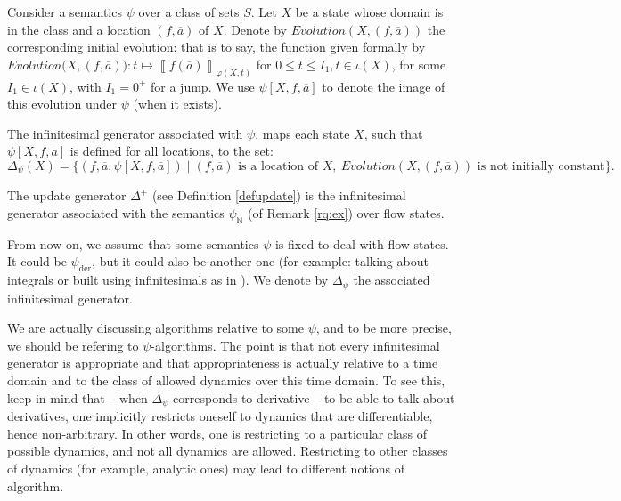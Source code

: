 \documentclass[envcountsame]{llncs}
\newcommand{\N}{\ensuremath{\mathbb{N}}}
\newcommand{\evaluation}[2][]{\ensuremath{\left\llbracket #2\right\rrbracket_{#1}}}
\newcommand{\val}[2]{\evaluation[#2]{#1}}
\newcommand{\update}[3]{(#1,#2,#3)}\spnewtheorem{postulate}{Postulate}{\bfseries}{\itshape}
\newcommand\LOCATION[2]{(#1,#2)}
\newcommand\Deltapsi{\Delta_\psi}
\newcommand{\nd}[1]{#1}\let\ep\endproof
\renewcommand{\endproof}{\qed\ep}
\begin{document}
Consider a semantics $\psi$ over a class of sets $S$.
Let $X$ be a state whose domain is in the class and a location $\LOCATION{f}{\overline{a}}$
of $X$.  Denote by $Evolution({X,\LOCATION{f}{\overline{a}}})$ the corresponding initial
evolution: that is to say, the
function given formally by $Evolution({X,\LOCATION{f}{\overline{a}})}: t \mapsto
\val{f(\overline{a})}{\varphi(X,t)}$ for $0 \le t \le I_1, t \in
\iota(X)$, for some $I_1 \in  \iota(X)$, with $I_1=0^+$ for a jump.
We use $\psi[X,f,\overline{a}]$ to denote the image of this evolution under $\psi$ (when it exists).

\begin{definition} The infinitesimal generator associated with $\psi$,
 maps each state $X$, such that $\psi[X,f,\overline{a}]$ is defined for all locations, to
the set: $\Deltapsi(X) =\{ \update{f}{\overline{a}}{\psi[X,f,\overline{a}]} \mid  \LOCATION{f}{\overline{a}} \mbox{ is a location of
  $X$} ,~
Evolution({X,\LOCATION{f}{\overline{a}}}) \text{ is not initially constant} \}.$
\end{definition}

The update generator $\Delta^+$ (see Definition
\ref{defupdate}) is the infinitesimal generator associated with the
semantics $\psi_\N$ (of Remark \ref{rq:ex}) over flow states. 

From now on, we assume that some semantics $\psi$ is fixed to deal
with flow states. It could be
$\psi_{\textrm{der}}$, but it could also be another one (for example:
talking about integrals or built using infinitesimals as in \cite{rust2000hybrid}).  We denote by
$\Deltapsi$ the associated infinitesimal generator.


We are actually discussing algorithms relative to some
    $\psi$, and to be more precise, we should be refering to $\psi$-algorithms.
The point is that not every infinitesimal generator is appropriate
    and that appropriateness is actually relative to a time domain and
    to the class of allowed dynamics over this time domain.
\nd{To see this, keep in mind that -- when $\Deltapsi$ corresponds to derivative
    -- to be able to talk about
    derivatives, one implicitly restricts oneself to dynamics that are
    differentiable, hence non-arbitrary. In other words, one is restricting
    to a particular class of possible dynamics, and not all dynamics
    are allowed. Restricting to other classes of dynamics (for example, analytic
    ones) may lead to  different notions of algorithm.}
\end{document}
